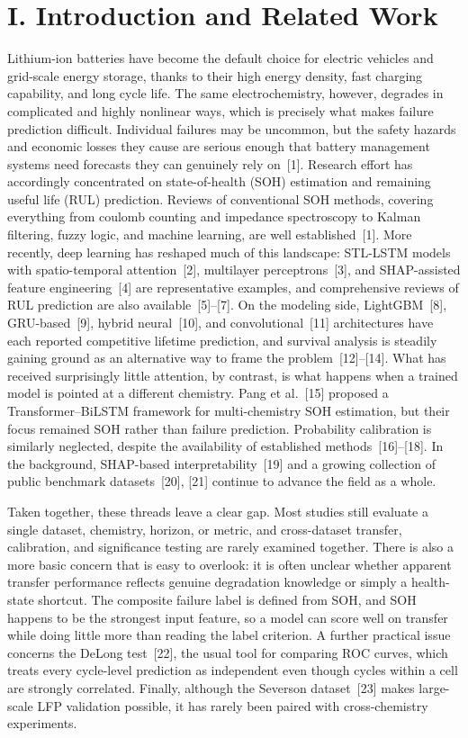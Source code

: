 \documentclass[conference]{IEEEtran}
\begin{document}
\section{I. Introduction and Related Work}
Lithium-ion batteries have become the default choice for electric
vehicles and grid-scale energy storage, thanks to their high energy
density, fast charging capability, and long cycle life. The same
electrochemistry, however, degrades in complicated and highly
nonlinear ways, which is precisely what makes failure prediction
difficult. Individual failures may be uncommon, but the safety hazards
and economic losses they cause are serious enough that battery
management systems need forecasts they can genuinely rely
on~[1]. Research effort has accordingly concentrated
on state-of-health (SOH) estimation and remaining useful life (RUL)
prediction. Reviews of conventional SOH methods, covering everything
from coulomb counting and impedance spectroscopy to Kalman filtering,
fuzzy logic, and machine learning, are well established~[1].
More recently, deep learning has reshaped much of this landscape:
STL-LSTM models with spatio-temporal attention~[2],
multilayer perceptrons~[3], and SHAP-assisted feature
engineering~[4] are representative examples, and
comprehensive reviews of RUL prediction are also
available~[5]--[7]. On the modeling side,
LightGBM~[8], GRU-based~[9], hybrid
neural~[10], and convolutional~[11]
architectures have each reported competitive lifetime prediction, and
survival analysis is steadily gaining ground as an alternative way to
frame the problem~[12]--[14]. What has
received surprisingly little attention, by contrast, is what happens
when a trained model is pointed at a different chemistry. Pang et
al.~[15] proposed a Transformer--BiLSTM framework for
multi-chemistry SOH estimation, but their focus remained SOH rather
than failure prediction. Probability calibration is similarly
neglected, despite the availability of established
methods~[16]--[18]. In the
background, SHAP-based interpretability~[19] and a
growing collection of public benchmark datasets~[20], [21]
continue to advance the field as a whole.

Taken together, these threads leave a clear gap. Most studies still
evaluate a single dataset, chemistry, horizon, or metric, and
cross-dataset transfer, calibration, and significance testing are
rarely examined together. There is also a more basic concern that is
easy to overlook: it is often unclear whether apparent transfer
performance reflects genuine degradation knowledge or simply a
health-state shortcut. The composite failure label is defined from
SOH, and SOH happens to be the strongest input feature, so a model can
score well on transfer while doing little more than reading the label
criterion. A further practical issue concerns the DeLong
test~[22], the usual tool for comparing ROC curves, which
treats every cycle-level prediction as independent even though cycles
within a cell are strongly correlated. Finally, although the Severson
dataset~[23] makes large-scale LFP validation possible,
it has rarely been paired with cross-chemistry experiments.
\end{document}
